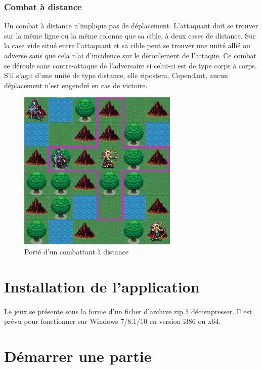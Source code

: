 \documentclass[a4paper]{article}
\begin{document}
\subsubsection{Combat à distance}
Un combat à distance n'implique pas de déplacement. L'attaquant doit se trouver sur la même ligne ou la même colonne que sa cible, à deux cases de distance. Sur la case vide situé entre l'attaquant et sa cible peut se trouver une unité allié ou adverse sans que cela n'ai d'incidence sur le déroulement de l'attaque.
Ce combat se déroule sans contre-attaque de l'adversaire si celui-ci est de type corps à corps. S'il s'agit d'une unité de type distance, elle ripostera. Cependant, aucun déplacement n'est engendré en cas de victoire.

\begin{figure}[h]
\begin{center}
\includegraphics[scale=0.7]{./img/range_arrow.png}
\caption{Porté d'un combattant à distance}
\end{center}
\end{figure}

\newpage
\section{Installation de l'application}
\paragraph{}
Le jeux se présente sous la forme d'un ficher d'archive zip à décompresser. Il est prévu pour fonctionner sur Windows 7/8.1/10 en version i386 ou x64.

\section{Démarrer une partie}
\end{document}
